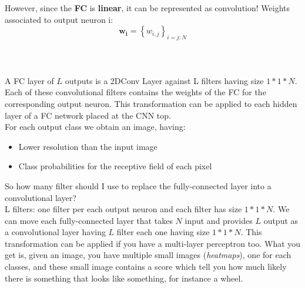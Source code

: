 However, since the \textbf{FC} is \textbf{linear}, it can be represented as convolution! Weights associated to output neuron i: $$\boldsymbol{w_i} = \left\{w_{i,j}\right\}_{i=j:N}$$ \\ \\ \\
A FC layer of $L$ outputs is a 2DConv Layer against L filters having size $1*1*N$. Each of these convolutional filters contains the weights of the FC for the corresponding output neuron. This transformation can be applied to each hidden layer of a FC network placed at the CNN top.  \\ 
For each output class we obtain an image, having: 
\begin{itemize}
    \item Lower resolution than the input image
    \item Class probabilities for the receptive field of each pixel
\end{itemize}{}


So how many filter should I use to replace the fully-connected layer into a convolutional layer? \\
L filters: one filter per each output neuron and each filter has size $1*1*N$. We can move each fully-connected layer that takes $N$ input and provides $L$ output as a convolutional layer having $L$ filter each one having size $1*1*N$. This transformation can be applied if you have a multi-layer perceptron too.
What you get is, given an image, you have multiple small images (\textit{heatmaps}), one for each classes, and these small image contains a score which tell you how much likely there is something that looks like something, for instance a wheel. 
